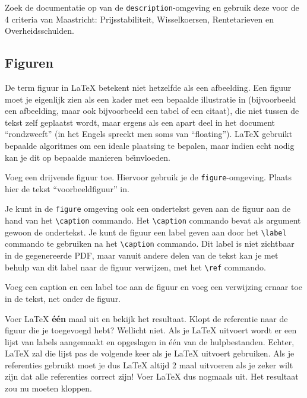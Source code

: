 \documentclass[12pt, dutch]{article}
\newcommand{\bs}{\textbackslash}
\begin{document}
\begin{tcolorbox}[title=Opgave 5c]
  Zoek de documentatie op van de \texttt{description}-omgeving en
  gebruik deze voor de 4 criteria van Maastricht: Prijsstabiliteit,
  Wisselkoersen, Rentetarieven en Overheidsschulden.
\end{tcolorbox}

\subsection{Figuren}

De term figuur in \LaTeX{} betekent niet hetzelfde als een afbeelding.
Een figuur moet je eigenlijk zien als een kader met een bepaalde
illustratie in (bijvoorbeeld een afbeelding, maar ook bijvoorbeeld een
tabel of een citaat), die niet tussen de tekst zelf geplaatst wordt,
maar ergens als een apart deel in het document ``rondzweeft'' (in het
Engels spreekt men soms van ``floating''). \LaTeX{} gebruikt bepaalde
algoritmes om een ideale plaatsing te bepalen, maar indien echt nodig
kan je dit op bepaalde manieren be\"{\i}nvloeden.

\begin{tcolorbox}[title=Opgave 5d]
  Voeg een drijvende figuur toe. Hiervoor gebruik je de
  \texttt{figure}-omgeving. Plaats hier de tekst ``voorbeeldfiguur'' in.
\end{tcolorbox}


Je kunt in de \texttt{figure} omgeving ook een ondertekst geven aan de figuur
aan de hand van het \texttt{\bs{}caption} commando. Het \texttt{\bs{}caption}
commando bevat als argument gewoon de ondertekst. Je kunt
de figuur een label geven aan door het \texttt{\bs{}label} commando te
gebruiken na het \texttt{\bs{}caption} commando. Dit
label is niet zichtbaar in de gegenereerde PDF, maar vanuit andere
delen van de tekst kan je met behulp van dit label naar de figuur
verwijzen, met het \texttt{\bs{}ref} commando.


\begin{tcolorbox}[title=Opgave 5d]
  Voeg een caption en een label toe aan de figuur en voeg een verwijzing ernaar
  toe in de tekst, net onder de figuur.
\end{tcolorbox}

Voer \LaTeX{} \textbf{\'e\'en} maal uit en bekijk het resultaat. Klopt
de referentie naar de figuur die je toegevoegd hebt? Wellicht niet.
Als je \LaTeX{} uitvoert wordt er een lijst van labels aangemaakt en opgeslagen
in \'e\'en van de hulpbestanden.
Echter, \LaTeX{} zal die lijst pas de volgende keer als je \LaTeX{}
uitvoert gebruiken. Als je referenties gebruikt moet je dus \LaTeX{}
altijd 2 maal uitvoeren als je zeker wilt zijn dat alle referenties
correct zijn! Voer \LaTeX{} dus nogmaals uit. Het resultaat zou nu
moeten kloppen.
\end{document}
